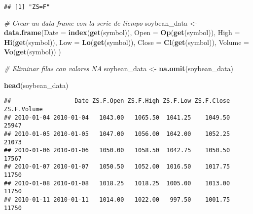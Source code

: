 \documentclass[
]{book}
\newenvironment{Shaded}{\begin{snugshade}}{\end{snugshade}}
\newcommand{\AttributeTok}[1]{\textcolor[rgb]{0.13,0.29,0.53}{#1}}
\newcommand{\CommentTok}[1]{\textcolor[rgb]{0.56,0.35,0.01}{\textit{#1}}}
\newcommand{\DecValTok}[1]{\textcolor[rgb]{0.00,0.00,0.81}{#1}}
\newcommand{\FunctionTok}[1]{\textcolor[rgb]{0.13,0.29,0.53}{\textbf{#1}}}
\newcommand{\NormalTok}[1]{#1}
\newcommand{\OtherTok}[1]{\textcolor[rgb]{0.56,0.35,0.01}{#1}}
\newcommand{\SpecialCharTok}[1]{\textcolor[rgb]{0.81,0.36,0.00}{\textbf{#1}}}
\begin{document}
\begin{verbatim}
## [1] "ZS=F"
\end{verbatim}

\begin{Shaded}
\begin{Highlighting}[]
\CommentTok{\# Crear un data frame con la serie de tiempo}
\NormalTok{soybean\_data }\OtherTok{\textless{}{-}} \FunctionTok{data.frame}\NormalTok{(}\AttributeTok{Date =} \FunctionTok{index}\NormalTok{(}\FunctionTok{get}\NormalTok{(symbol)), }
                           \AttributeTok{Open =} \FunctionTok{Op}\NormalTok{(}\FunctionTok{get}\NormalTok{(symbol)),}
                           \AttributeTok{High =} \FunctionTok{Hi}\NormalTok{(}\FunctionTok{get}\NormalTok{(symbol)),}
                           \AttributeTok{Low =} \FunctionTok{Lo}\NormalTok{(}\FunctionTok{get}\NormalTok{(symbol)),}
                           \AttributeTok{Close =} \FunctionTok{Cl}\NormalTok{(}\FunctionTok{get}\NormalTok{(symbol)),}
                           \AttributeTok{Volume =} \FunctionTok{Vo}\NormalTok{(}\FunctionTok{get}\NormalTok{(symbol))}
\NormalTok{)}

\CommentTok{\# Eliminar filas con valores NA}
\NormalTok{soybean\_data }\OtherTok{\textless{}{-}} \FunctionTok{na.omit}\NormalTok{(soybean\_data)}


\FunctionTok{head}\NormalTok{(soybean\_data)}
\end{Highlighting}
\end{Shaded}

\begin{verbatim}
##                  Date ZS.F.Open ZS.F.High ZS.F.Low ZS.F.Close ZS.F.Volume
## 2010-01-04 2010-01-04   1043.00   1065.50  1041.25    1049.50       25947
## 2010-01-05 2010-01-05   1047.00   1056.00  1042.00    1052.25       21073
## 2010-01-06 2010-01-06   1050.00   1058.50  1042.75    1050.50       17567
## 2010-01-07 2010-01-07   1050.50   1052.00  1016.50    1017.75       11750
## 2010-01-08 2010-01-08   1018.25   1018.25  1005.00    1013.00       11750
## 2010-01-11 2010-01-11   1014.00   1022.00   997.50    1001.75       11750
\end{verbatim}

\begin{Shaded}
\end{Shaded}
\end{document}
